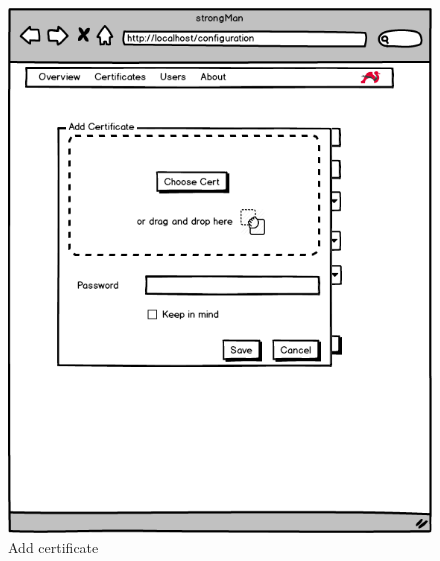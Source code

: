 \begin{figure}[H]
	\centering
	\includegraphics[width=400pt]{images/mockups/add_cert4.png}
	\caption{Add certificate}
\end{figure}

